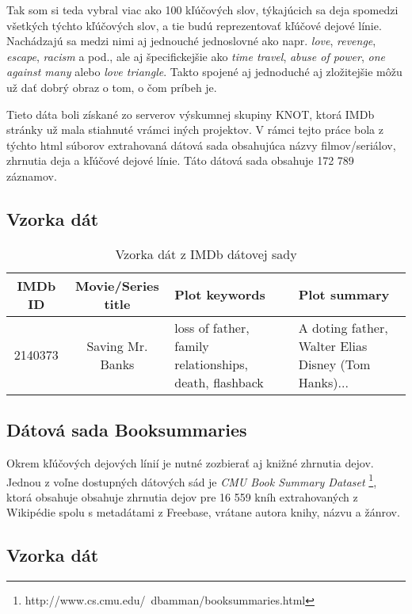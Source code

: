 Tak som si teda vybral viac ako 100 kľúčových slov, týkajúcich sa deja spomedzi všetkých týchto kľúčových slov, a tie budú reprezentovať kľúčové dejové línie. Nachádzajú sa medzi nimi aj jednouché jednoslovné ako napr. \textit{love}, \textit{revenge}, \textit{escape}, \textit{racism} a pod., ale aj špecifickejšie ako \textit{time travel}, \textit{abuse of power}, \textit{one against many} alebo \textit{love triangle}. Takto spojené aj jednoduché aj zložitejšie môžu už dať dobrý obraz o tom, o čom príbeh je.

Tieto dáta boli získané zo serverov výskumnej skupiny KNOT, ktorá IMDb stránky už mala stiahnuté vrámci iných projektov. V rámci tejto práce bola z týchto html súborov extrahovaná dátová sada obsahujúca názvy filmov/seriálov, zhrnutia deja a kľúčové dejové línie. Táto dátová sada obsahuje 172 789 záznamov.

\subsection*{Vzorka dát}

\begin{table}[hbt]
\centering
\caption{Vzorka dát z IMDb dátovej sady}
\label{imdb}
\begin{tabular}{|c|c|
>{\centering\arraybackslash}m{7em}|
>{\centering\arraybackslash}m{7em}|}
\hline
IMDb ID & Movie/Series title & Plot keywords & Plot summary \\
\hline
2140373 & Saving Mr. Banks & loss of father, family relationships, death, flashback &  A doting father, Walter Elias Disney (Tom Hanks)...\\ 
\hline

\end{tabular}
\end{table}

\subsection{Dátová sada Booksummaries}
Okrem kľúčových dejových línií je nutné zozbierať aj knižné zhrnutia dejov. Jednou z voľne dostupných dátových sád je \textit{CMU Book Summary Dataset} \footnote{http://www.cs.cmu.edu/~dbamman/booksummaries.html}, ktorá obsahuje obsahuje zhrnutia dejov pre 16 559 kníh extrahovaných z Wikipédie spolu s metadátami z Freebase, vrátane autora knihy, názvu a žánrov.

\subsection*{Vzorka dát}

